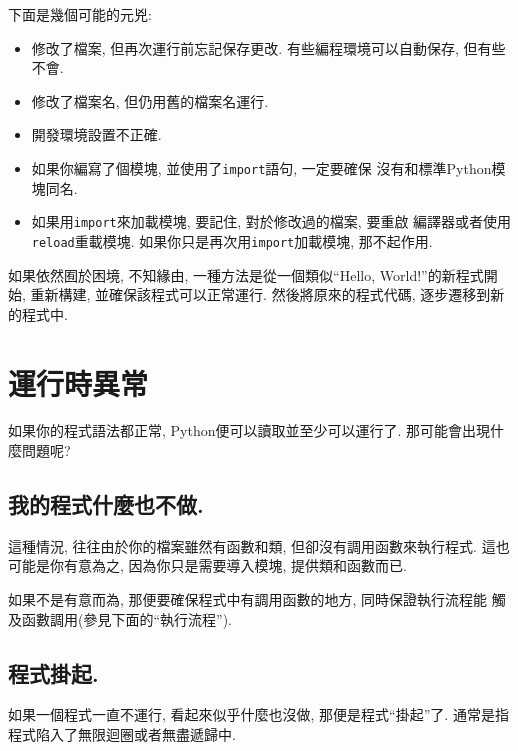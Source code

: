 \documentclass[10pt]{book}
\begin{document}
下面是幾個可能的元兇:

\begin{itemize}

\item 修改了檔案, 但再次運行前忘記保存更改. 有些編程環境可以自動保存, 但有些不會. 

\item 修改了檔案名, 但仍用舊的檔案名運行. 

\item 開發環境設置不正確. 

\item 如果你編寫了個模塊, 並使用了{\tt import}語句, 一定要確保
沒有和標準Python模塊同名. 

\item 如果用{\tt import}來加載模塊, 要記住, 對於修改過的檔案, 要重啟
編譯器或者使用{\tt reload}重載模塊. 
如果你只是再次用{\tt import}加載模塊, 那不起作用. 

\end{itemize}

如果依然囿於困境, 不知緣由, 
一種方法是從一個類似``Hello, World!''的新程式開始, 重新構建, 
並確保該程式可以正常運行. 
然後將原來的程式代碼, 逐步遷移到新的程式中. 


\section{運行時異常}

如果你的程式語法都正常, Python便可以讀取並至少可以運行了. 
那可能會出現什麼問題呢?


\subsection{我的程式什麼也不做.}

這種情況, 往往由於你的檔案雖然有函數和類, 但卻沒有調用函數來執行程式. 
這也可能是你有意為之, 因為你只是需要導入模塊, 提供類和函數而已. 

如果不是有意而為, 那便要確保程式中有調用函數的地方, 同時保證執行流程能
觸及函數調用(參見下面的``執行流程''). 


\subsection{程式掛起.}

如果一個程式一直不運行, 看起來似乎什麼也沒做, 那便是程式``掛起''了. 
通常是指程式陷入了無限迴圈或者無盡遞歸中. 
\end{document}
